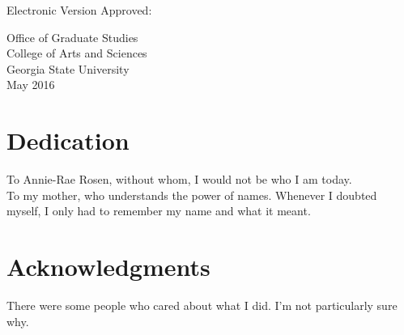 \documentclass[11pt,letterpaper]{report}
\begin{document}
	
	\noindent
	Electronic Version Approved:\\
	\vspace{1cm}
	
	\noindent
	Office of Graduate Studies \\
	College of Arts and Sciences \\
	Georgia State University\\
	May 2016 
	
	\newpage
	\pagestyle{plain}
	
	\chapter*{Dedication}
	To Annie-Rae Rosen, without whom, I would not be who I am today.
	\\
	To my mother, who understands the power of names.
	Whenever I doubted myself, I only had to remember my name and what it meant.
	
	\chapter*{Acknowledgments}	
	There were some people who cared about what I did.  
	I'm not particularly sure why.
	
	
	\setcounter{tocdepth}{4}
	
	\tableofcontents
	\listoftables
	\listoffigures
	\newpage
	

	\clearpage
	 
	 
	
	 
	
	
	
	 
	
	
	
	
\end{document}
